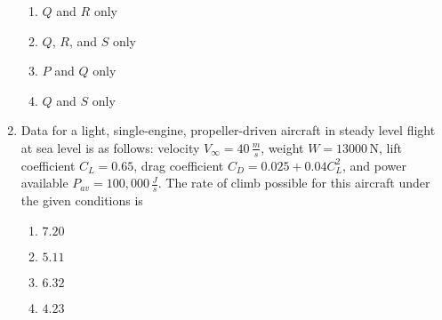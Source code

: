 \documentclass[journal]{IEEEtran}
\begin{document}
\begin{enumerate}
\begin{enumerate}
    \item $Q$ and $R$ only
    \item $Q$, $R$, and $S$ only
    \item $P$ and $Q$ only
    \item $Q$ and $S$ only
\end{enumerate}

\item Data for a light, single-engine, propeller-driven aircraft in steady level flight at sea level is as follows: velocity $V_{\infty} = 40 \, \frac{m}{s}$, weight $W = 13000 \, \text{N}$, lift coefficient $C_L = 0.65$, drag coefficient $C_D = 0.025 + 0.04 C_L^2$, and power available $P_{av} = 100,000 \, \frac{J}{s}$. The rate of climb possible for this aircraft under the given conditions is


\begin{enumerate}
    \item $7.20$
    \item $5.11$
    \item $6.32$
    \item $4.23$
\end{enumerate}






\end{enumerate}
\end{document}
